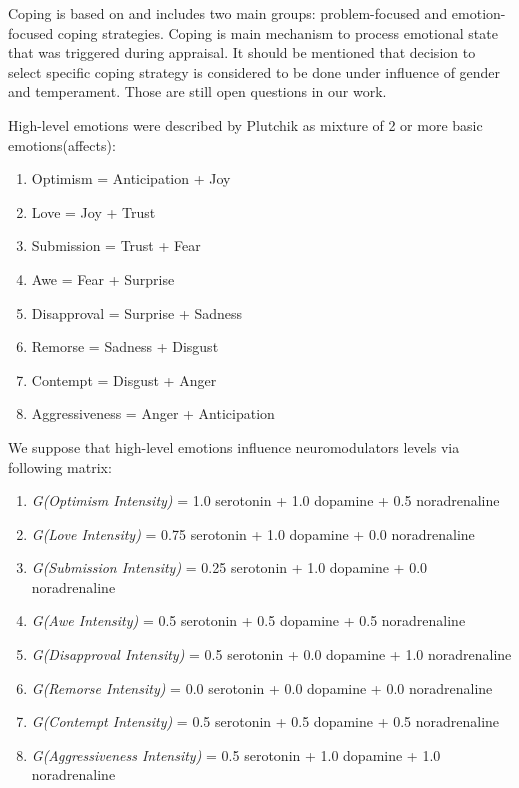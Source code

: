 Coping is based on \cite{dont_worry_be_happy} and includes two main groups: problem-focused and emotion-focused coping strategies. Coping is main mechanism to process emotional state that was triggered during appraisal. It should be mentioned that decision to select specific coping strategy is considered to be done under influence of gender and temperament. Those are still open questions in our work.

High-level emotions were described by Plutchik \cite{natureofemotions} as mixture of 2 or more basic emotions(affects):

\begin{enumerate}
	\item  Optimism = Anticipation + Joy
	\item  Love = Joy + Trust
	\item  Submission = Trust + Fear
	\item  Awe = Fear + Surprise
	\item  Disapproval = Surprise + Sadness
	\item  Remorse = Sadness + Disgust
	\item  Contempt = Disgust + Anger
	\item  Aggressiveness =	Anger + Anticipation
\end{enumerate}

We suppose that high-level emotions influence neuromodulators levels via following matrix:

\begin{enumerate}
	\item  \emph{G(Optimism Intensity)} = 1.0 serotonin  + 1.0 dopamine + 0.5 noradrenaline
	\item  \emph{G(Love Intensity)} = 0.75 serotonin + 1.0 dopamine + 0.0 noradrenaline
	\item  \emph{G(Submission Intensity)} = 0.25 serotonin + 1.0 dopamine + 0.0 noradrenaline
	\item  \emph{G(Awe Intensity)} = 0.5 serotonin + 0.5 dopamine + 0.5 noradrenaline
	\item  \emph{G(Disapproval Intensity)} = 0.5 serotonin + 0.0 dopamine + 1.0 noradrenaline
	\item  \emph{G(Remorse Intensity)} = 0.0 serotonin + 0.0 dopamine + 0.0 noradrenaline
	\item  \emph{G(Contempt Intensity)} = 0.5 serotonin + 0.5 dopamine + 0.5 noradrenaline
	\item  \emph{G(Aggressiveness Intensity)} = 0.5 serotonin + 1.0 dopamine + 1.0 noradrenaline
\end{enumerate}

